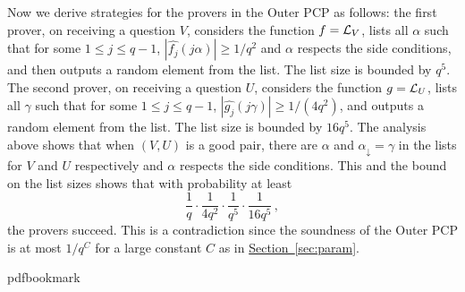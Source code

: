\documentclass[10pt]{article}
\theoremstyle{definition}
\numberwithin{equation}{section}
\newcommand{\expref}[2]{\texorpdfstring{\hyperref[#2]{#1~\ref{#2}}}{#1~\ref{#2}}}
\newcommand\calL{{\cal L}}
\begin{document}
%
Now we derive strategies for the provers in the Outer PCP as follows: the first prover,
on receiving a question $V$, considers the function $f = \calL_V$,
lists all $\alpha$ such that for some $1 \leq j \leq q-1$, $|\widehat{f_j}(j\alpha)| \geq {1}/{q^2}$ and $\alpha$ respects the side conditions, and
then outputs a random element from the list. The list size is bounded by $q^5$.
The second prover, on receiving a question $U$, considers the function
$g = \calL_U$,
lists all $\gamma$
such that for some $1 \leq j \leq q-1$, $|\widehat{g_j}(j\gamma)| \geq {1}/{(4q^2)}$, and
outputs a random element from the list. The list size is bounded by $16q^5$.
The analysis above shows that when $(V,U)$ is a good pair, there are $\alpha$
and $\alpha_\downarrow = \gamma$ in the lists for $V$ and $U$ respectively and $\alpha$
respects the side conditions. This and the bound on the list sizes
shows that with probability at least 
\[
\frac{1}{q}\cdot \frac{1}{4q^2} \cdot\frac{1}{q^5}
\cdot \frac{1}{16q^5}\,,
\]
the provers succeed. This is a contradiction since the
soundness of the Outer PCP is at most ${1}/{q^C}$ for a large constant $C$ as in
\expref{Section}{sec:param}.
\clearpage
\begingroup\raggedright
%
%
%
%
%
\providecommand{\bibhead}[1]{}
%
\expandafter\ifx\csname pdfbookmark\endcsname\relax%
  \providecommand{\tocrefpdfbookmark}{}
\else\providecommand{\tocrefpdfbookmark}{%
   \hypertarget{tocreferences}{}%
   \pdfbookmark[1]{References}{tocreferences}}%
\fi
\end{document}
